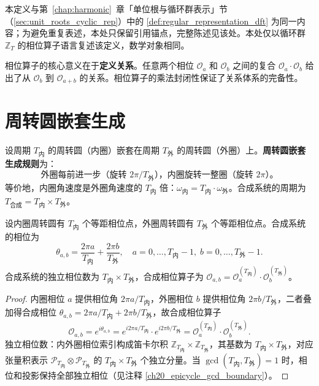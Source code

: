 \begin{definition}[正则表示与DFT对角化]\label{def:regular_representation_yijing}
本定义与第~\ref{chap:harmonic}~章「单位根与循环群表示」节（\cref{sec:unit_roots_cyclic_rep}）中的 \cref{def:regular_representation_dft} 为同一内容；为避免重复表述，本处只保留引用锚点，完整陈述见该处。本处仅以循环群 $\mathbb{Z}_T$ 的相位算子语言复述该定义，数学对象相同。
\end{definition}

\begin{remark}[相位算子的关系本质]
相位算子的核心意义在于\textbf{定义关系}。任意两个相位 $\mathcal{O}_a$ 和 $\mathcal{O}_b$ 之间的复合 $\mathcal{O}_a \cdot \mathcal{O}_b$ 给出了从 $\mathcal{O}_b$ 到 $\mathcal{O}_{a+b}$ 的关系。相位算子的乘法封闭性保证了关系体系的完备性。
\end{remark}

\section{周转圆嵌套生成}

\begin{definition}[周转圆嵌套生成规则]\label{def:epicycle_nesting_rule}
设周期 $T_{\text{内}}$ 的周转圆（内圈）嵌套在周期 $T_{\text{外}}$ 的周转圆（外圈）上。\textbf{周转圆嵌套生成规则}为：
\[
\text{外圈每前进一步（旋转 } 2\pi/T_{\text{外}} \text{），内圈旋转一整圈（旋转 } 2\pi \text{）。}
\]
等价地，内圈角速度是外圈角速度的 $T_{\text{内}}$ 倍：$\omega_{\text{内}} = T_{\text{内}} \cdot \omega_{\text{外}}$。合成系统的周期为 $T_{\text{合成}} = T_{\text{内}} \times T_{\text{外}}$。
\end{definition}

\begin{theorem}[周转圆嵌套生成定理]\label{thm:epicycle_nesting_generation}
设内圈周转圆有 $T_{\text{内}}$ 个等距相位点，外圈周转圆有 $T_{\text{外}}$ 个等距相位点。合成系统的相位为
\[
\theta_{a,b} = \frac{2\pi a}{T_{\text{内}}} + \frac{2\pi b}{T_{\text{外}}}, \quad a = 0, \dots, T_{\text{内}}-1,\; b = 0, \dots, T_{\text{外}}-1.
\]
合成系统的独立相位数为 $T_{\text{内}} \times T_{\text{外}}$，合成相位算子为 $\mathcal{O}_{a,b} = \mathcal{O}_a^{(T_{\text{内}})} \cdot \mathcal{O}_b^{(T_{\text{外}})}$。
\end{theorem}

\begin{proof}
内圈相位 $a$ 提供相位角 $2\pi a/T_{\text{内}}$，外圈相位 $b$ 提供相位角 $2\pi b/T_{\text{外}}$，二者叠加得合成相位 $\theta_{a,b} = 2\pi a/T_{\text{内}} + 2\pi b/T_{\text{外}}$，故合成相位算子
\[
\mathcal{O}_{a,b} = e^{i\theta_{a,b}} = e^{i2\pi a/T_{\text{内}}} \cdot e^{i2\pi b/T_{\text{外}}} = \mathcal{O}_a^{(T_{\text{内}})} \cdot \mathcal{O}_b^{(T_{\text{外}})}.
\]
独立相位数：内外圈相位索引构成笛卡尔积 $\mathbb{Z}_{T_{\text{内}}} \times \mathbb{Z}_{T_{\text{外}}}$，其基数为 $T_{\text{内}} \times T_{\text{外}}$，对应张量积表示 $\mathcal{P}_{T_{\text{内}}} \otimes \mathcal{P}_{T_{\text{外}}}$ 的 $T_{\text{内}} \times T_{\text{外}}$ 个独立分量。当 $\gcd(T_{\text{内}}, T_{\text{外}}) = 1$ 时，相位和投影保持全部独立相位（见注释 \ref{ch20_epicycle_gcd_boundary}）。
\end{proof}

